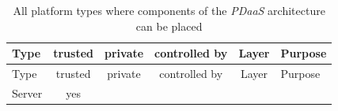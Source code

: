 \documentclass[12pt,english,a4paper,titlepage,cleardoublepage=empty,dottedtoc]{report}
\begin{document}
\begin{longtable}[]{@{}lccccl@{}}
\caption{All platform types where components of the \emph{PDaaS}
architecture can be placed
\label{tbl:platforms-characteristics}}\tabularnewline
\toprule
\begin{minipage}[b]{0.08\columnwidth}\raggedright\strut
Type\strut
\end{minipage} & \begin{minipage}[b]{0.08\columnwidth}\centering\strut
trusted\strut
\end{minipage} & \begin{minipage}[b]{0.13\columnwidth}\centering\strut
private\strut
\end{minipage} & \begin{minipage}[b]{0.13\columnwidth}\centering\strut
controlled by\strut
\end{minipage} & \begin{minipage}[b]{0.10\columnwidth}\centering\strut
Layer\strut
\end{minipage} & \begin{minipage}[b]{0.29\columnwidth}\raggedright\strut
Purpose\strut
\end{minipage}\tabularnewline
\midrule
\endfirsthead
\toprule
\begin{minipage}[b]{0.08\columnwidth}\raggedright\strut
Type\strut
\end{minipage} & \begin{minipage}[b]{0.08\columnwidth}\centering\strut
trusted\strut
\end{minipage} & \begin{minipage}[b]{0.13\columnwidth}\centering\strut
private\strut
\end{minipage} & \begin{minipage}[b]{0.13\columnwidth}\centering\strut
controlled by\strut
\end{minipage} & \begin{minipage}[b]{0.10\columnwidth}\centering\strut
Layer\strut
\end{minipage} & \begin{minipage}[b]{0.29\columnwidth}\raggedright\strut
Purpose\strut
\end{minipage}\tabularnewline
\midrule
\endhead
\begin{minipage}[t]{0.16\columnwidth}\raggedright\strut
Server\strut
\end{minipage} & \begin{minipage}[t]{0.16\columnwidth}\centering\strut
yes\strut
\end{minipage} & \begin{minipage}[t]{0.16\columnwidth}\centering\strut

\end{minipage}
\end{longtable}
\end{document}
